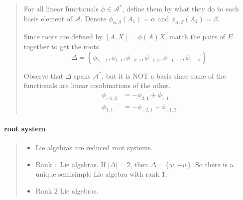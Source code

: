 \documentclass[letterpaper, 10pt]{article}
\theoremstyle{theostyle}
\begin{document}
\begin{quote}
\begin{itemize}
        For all linear functionals \(\phi \in \mathcal{A}^\ast\), define them by what they do to each basis element of \(\mathcal{A}\).
        Denote \(\phi_{\alpha, \beta} (A_1) = \alpha\) and \(\phi_{\alpha, \beta} (A_2) = \beta\).
        
        Since roots are defined by \([A, X] = \phi(A)X\), match the pairs of \(E\) together to get the roots
        \[\Delta = \left\{\phi_{2, -1}, \phi_{1, 1}, \phi_{-2, 1}, \phi_{-1, 2}, \phi_{-1, -1}, \phi_{1, -2}\right\} \]

        Observe that \(\Delta\) spans \(\mathcal{A}^\ast\), but it is NOT a basis since some of the functionals are linear combinations of the other.
        \begin{align*}
            \phi_{-1, 2} &= - \phi_{2,1} + \phi_{1, 1} \\
            \phi_{1, 1} &= - \phi_{-2, 1} + \phi_{-1, 2}
        \end{align*}
    \end{itemize}
\end{quote}

\paragraph{root system}
\begin{quote}
    \begin{itemize}
        \item Lie algebras are reduced root systems.
        \item Rank \(1\) Lie algebras.
        If \(\lvert \Delta \rvert = 2\), then \(\Delta = \{w, -w\}\).
        So there is a unique semisimple Lie algebra with rank \(1\).
        \item Rank \(2\) Lie algebras.
    \end{itemize}
\end{quote}
\end{document}

